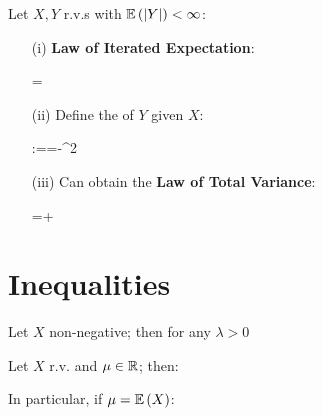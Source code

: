\documentclass[12pt]{extarticle}
\begin{document}
\begin{tcolorbox}[colback=white]
    \begin{theorem}
        Let $X,Y$ r.v.s with $\mathbb{E}\left(|Y|\right)<\infty$: \begin{enumerate}
            \item[(i)] \textbf{Law of Iterated Expectation}: \begin{eqnbox}
                =
            \end{eqnbox}
            \item[(ii)] Define the  of $Y$ given $X$: \begin{eqnbox}
                :==-^2
            \end{eqnbox}
            \item[(iii)] Can obtain the \textbf{Law of Total Variance}: \begin{eqnbox}
                =+
            \end{eqnbox}
        \end{enumerate}
    \end{theorem}
\end{tcolorbox}

\pagebreak
\section{Inequalities}
\begin{tcolorbox}[colback=white]
    \begin{theorem}
        Let $X$ non-negative; then for any $\lambda>0$
        \begin{eqnbox}
            \leq{}
        \end{eqnbox}
    \end{theorem}
    \begin{corollary}
        Let $X$ r.v. and $\mu\in\mathbb{R}$; then: 
        \begin{eqnbox}
            \leq{}
        \end{eqnbox}
        In particular, if $\mu=\mathbb{E}\left(X\right)$: 
        \begin{eqnbox}
            \leq{}
        \end{eqnbox}
    \end{corollary}
\end{tcolorbox}
\end{document}
